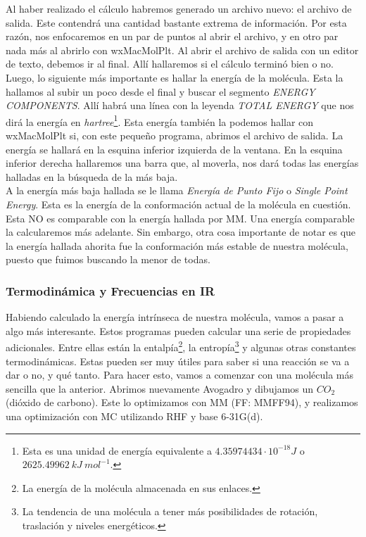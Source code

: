 \documentclass[10pt,letterpaper]{article}
\begin{document}
Al haber realizado el c\'alculo habremos generado un archivo nuevo: el archivo de salida. Este contendr\'a una cantidad bastante extrema de informaci\'on. Por esta raz\'on, nos enfocaremos en un par de puntos al abrir el archivo, y en otro par nada m\'as al abrirlo con wxMacMolPlt. Al abrir el archivo de salida con un editor de texto, debemos ir al final. All\'i hallaremos si el c\'alculo termin\'o bien o no. Luego, lo siguiente m\'as importante es hallar la energ\'ia de la mol\'ecula. Esta la hallamos al subir un poco desde el final y buscar el segmento \textit{ENERGY COMPONENTS}. All\'i habr\'a una l\'inea con la leyenda \textit{TOTAL ENERGY} que nos dir\'a la energ\'ia en \emph{hartree}\footnote{Esta es una unidad de energ\'ia equivalente a $4.35974434 \cdot 10^{-18} J$ o $2625.49962\ kJ\ mol^{-1}$.}. Esta energ\'ia tambi\'en la podemos hallar con wxMacMolPlt si, con este peque\~no programa, abrimos el archivo de salida. La energ\'ia se hallar\'a en la esquina inferior izquierda de la ventana. En la esquina inferior derecha hallaremos una barra que, al moverla, nos dar\'a todas las energ\'ias halladas en la b\'usqueda de la m\'as baja.\\

A la energ\'ia m\'as baja hallada se le llama \emph{Energ\'ia de Punto Fijo} o \emph{Single Point Energy}. Esta es la energ\'ia de la conformaci\'on actual de la mol\'ecula en cuesti\'on. Esta NO es comparable con la energ\'ia hallada por MM. Una energ\'ia comparable la calcularemos m\'as adelante. Sin embargo, otra cosa importante de notar es que la energ\'ia hallada ahorita fue la conformaci\'on m\'as estable de nuestra mol\'ecula, puesto que fuimos buscando la menor de todas.

\subsubsection{Termodin\'amica y Frecuencias en IR}

Habiendo calculado la energ\'ia intr\'inseca de nuestra mol\'ecula, vamos a pasar a algo m\'as interesante. Estos programas pueden calcular una serie de propiedades adicionales. Entre ellas est\'an la entalp\'ia\footnote{La energ\'ia de la mol\'ecula almacenada en sus enlaces.}, la entrop\'ia\footnote{La tendencia de una mol\'ecula a tener m\'as posibilidades de rotaci\'on, traslaci\'on y niveles energ\'eticos.} y algunas otras constantes termodin\'amicas. Estas pueden ser muy \'utiles para saber si una reacci\'on se va a dar o no, y qu\'e tanto. Para hacer esto, vamos a comenzar con una mol\'ecula m\'as sencilla que la anterior. Abrimos nuevamente Avogadro y dibujamos un $CO_2$ (di\'oxido de carbono). Este lo optimizamos con MM (FF: MMFF94), y realizamos una optimizaci\'on con MC utilizando RHF y base 6-31G(d).\\
\end{document}
